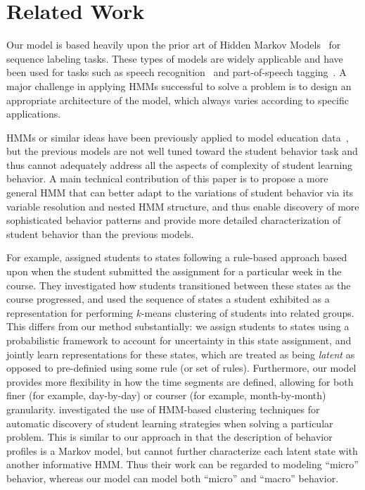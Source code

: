 \section{Related Work}

Our model is based heavily upon the prior art of Hidden Markov
Models~\cite{Rabiner:1990:RSR} for sequence labeling tasks. These types of
models are widely applicable and have been used for tasks such as speech
recognition~\cite{Huang:1990:HMM} and part-of-speech
tagging~\cite{Jurafsky:2009:SLP}. A major challenge in applying HMMs successful to solve a problem is to design an appropriate architecture of the model, which always varies according to specific applications. 

HMMs or similar ideas have been previously 
applied to model education data~\cite{Shih:2010:EDM,Kizilcec:2013:LAK}, but the previous models are not well tuned toward the student behavior task and thus cannot
adequately address all the aspects of complexity of student learning behavior. 
A main technical contribution of this paper is to propose a more general
HMM that can better adapt to the variations of student behavior via its variable resolution
and nested HMM structure, and thus enable discovery of more sophisticated behavior patterns and provide more detailed characterization of student behavior than the previous models.
 
For example, \citet{Kizilcec:2013:LAK} assigned students to states following a rule-based
approach based upon when the student submitted the assignment for a
particular week in the course. They investigated how students transitioned
between these states as the course progressed, and used the sequence of
states a student exhibited as a representation for performing $k$-means
clustering of students into related groups. This differs from our method
substantially: we assign students to states using a probabilistic
framework to account for uncertainty in this state assignment, and jointly
learn representations for these states, which are treated as being
\emph{latent} as opposed to pre-definied using some rule (or set of rules).
Furthermore, our model provides more flexibility in how the time segments
are defined, allowing for both finer (for example, day-by-day) or courser
(for example, month-by-month) granularity. \citet{Shih:2010:EDM} investigated the use of HMM-based clustering
techniques for automatic discovery of student learning strategies when
solving a particular problem. This is similar to our approach in that the
description of behavior profiles is a Markov model, but cannot further characterize
each latent state with another informative HMM. Thus their work can be regarded
to modeling ``micro'' behavior, whereas our model can model both ``micro'' and ``macro'' behavior. 

